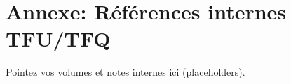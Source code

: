 
\section*{Annexe: Références internes TFU/TFQ}
Pointez vos volumes et notes internes ici (placeholders).